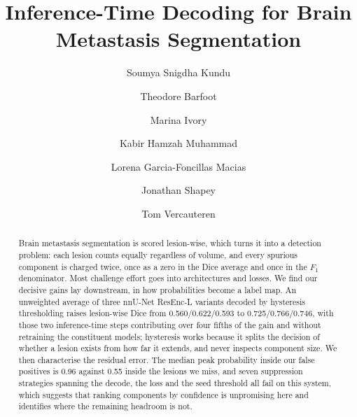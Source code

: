 \documentclass[runningheads]{llncs}
\begin{document}
\title{Inference-Time Decoding for Brain\\ Metastasis Segmentation}

\author{%
Soumya Snigdha Kundu \and
Theodore Barfoot \and
Marina Ivory \and
Kabir Hamzah Muhammad \and
Lorena Garcia-Foncillas Macias \and
Jonathan Shapey \and
Tom Vercauteren%
}


\maketitle

\begin{abstract}
Brain metastasis segmentation is scored lesion-wise, which turns it into a detection problem:
each lesion counts equally regardless of volume, and every spurious component is charged twice,
once as a zero in the Dice average and once in the $F_1$ denominator. Most challenge effort goes
into architectures and losses. We find our decisive gains lay downstream, in how probabilities
become a label map. An unweighted average of three nnU-Net ResEnc-L variants decoded by
hysteresis thresholding raises lesion-wise Dice from 0.560/0.622/0.593 to 0.725/0.766/0.746, with
those two inference-time steps contributing over four fifths of the gain and without retraining
the constituent models; hysteresis works because it splits the decision of whether a lesion
exists from how far it extends, and never inspects component size. We then characterise the
residual error. The median peak probability inside our false positives is 0.96 against 0.55
inside the lesions we miss, and seven suppression strategies spanning the decode, the loss and
the seed threshold all fail on this system, which suggests that ranking components by confidence
is unpromising here and identifies where the remaining headroom is not.

\end{abstract}
\end{document}
